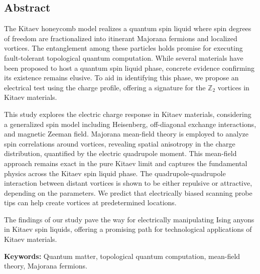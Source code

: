 \clearpage
\setcounter{page}{10}
\begin{absolutelynopagebreak}
\chapter{Abstract}

The Kitaev honeycomb model realizes a quantum spin liquid where spin degrees of freedom are fractionalized into itinerant Majorana fermions and localized vortices.
The entanglement among these particles holds promise for executing fault-tolerant topological quantum computation.
While several materials have been proposed to host a quantum spin liquid phase, concrete evidence confirming its existence remains elusive.
To aid in identifying this phase, we propose an electrical test using the charge profile, offering a signature for the $\mathbb{Z}_2$ vortices in Kitaev materials.


This study explores the electric charge response in Kitaev materials, considering a generalized spin model including Heisenberg, off-diagonal exchange interactions, and magnetic Zeeman field.
Majorana mean-field theory is employed to analyze spin correlations around vortices, revealing spatial anisotropy in the charge distribution, quantified by the electric quadrupole moment.
This mean-field approach remains exact in the pure Kitaev limit and captures the fundamental physics across the Kitaev spin liquid phase.
The quadrupole-quadrupole interaction between distant vortices is shown to be either repulsive or attractive, depending on the parameters. We predict that electrically biased scanning probe tips can help create vortices at predetermined locations.

The findings of our study pave the way for electrically manipulating Ising anyons in Kitaev spin liquids, offering a promising path for technological applications of Kitaev materials.


\vspace{1cm}


\textbf{Keywords:} Quantum matter, topological quantum computation, mean-field theory, Majorana fermions.

\end{absolutelynopagebreak}

